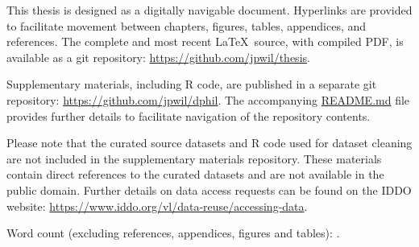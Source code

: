 This thesis is designed as a digitally navigable document. Hyperlinks are provided to facilitate movement between chapters, figures, tables, appendices, and references. The complete and most recent \LaTeX\ source, with compiled PDF, is available as a git repository: \url{https://github.com/jpwil/thesis}.

Supplementary materials, including R code, are published in a separate git repository: \url{https://github.com/jpwil/dphil}. The accompanying \href{https://github.com/jpwil/dphil}{README.md} file provides further details to facilitate navigation of the repository contents.

Please note that the curated source datasets and R code used for dataset cleaning are not included in the supplementary materials repository. These materials contain direct references to the curated datasets and are not available in the public domain. Further details on data access requests can be found on the IDDO website: \url{https://www.iddo.org/vl/data-reuse/accessing-data}.

Word count (excluding references, appendices, figures and tables): .